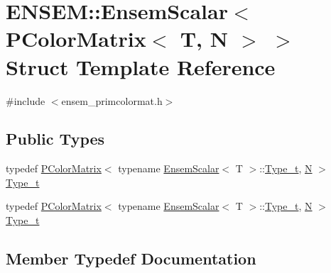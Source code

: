 \hypertarget{structENSEM_1_1EnsemScalar_3_01PColorMatrix_3_01T_00_01N_01_4_01_4}{}\section{E\+N\+S\+EM\+:\+:Ensem\+Scalar$<$ P\+Color\+Matrix$<$ T, N $>$ $>$ Struct Template Reference}
\label{structENSEM_1_1EnsemScalar_3_01PColorMatrix_3_01T_00_01N_01_4_01_4}


{\ttfamily \#include $<$ensem\+\_\+primcolormat.\+h$>$}

\subsection*{Public Types}
\begin{DoxyCompactItemize}
\item 
typedef \mbox{\hyperlink{classENSEM_1_1PColorMatrix}{P\+Color\+Matrix}}$<$ typename \mbox{\hyperlink{structENSEM_1_1EnsemScalar}{Ensem\+Scalar}}$<$ T $>$\+::\mbox{\hyperlink{structENSEM_1_1EnsemScalar_3_01PColorMatrix_3_01T_00_01N_01_4_01_4_a627b90bc6a46b2ef5b68cc55ae3f914d}{Type\+\_\+t}}, \mbox{\hyperlink{operator__name__util_8cc_a7722c8ecbb62d99aee7ce68b1752f337}{N}} $>$ \mbox{\hyperlink{structENSEM_1_1EnsemScalar_3_01PColorMatrix_3_01T_00_01N_01_4_01_4_a627b90bc6a46b2ef5b68cc55ae3f914d}{Type\+\_\+t}}
\item 
typedef \mbox{\hyperlink{classENSEM_1_1PColorMatrix}{P\+Color\+Matrix}}$<$ typename \mbox{\hyperlink{structENSEM_1_1EnsemScalar}{Ensem\+Scalar}}$<$ T $>$\+::\mbox{\hyperlink{structENSEM_1_1EnsemScalar_3_01PColorMatrix_3_01T_00_01N_01_4_01_4_a627b90bc6a46b2ef5b68cc55ae3f914d}{Type\+\_\+t}}, \mbox{\hyperlink{operator__name__util_8cc_a7722c8ecbb62d99aee7ce68b1752f337}{N}} $>$ \mbox{\hyperlink{structENSEM_1_1EnsemScalar_3_01PColorMatrix_3_01T_00_01N_01_4_01_4_a627b90bc6a46b2ef5b68cc55ae3f914d}{Type\+\_\+t}}
\end{DoxyCompactItemize}


\subsection{Member Typedef Documentation}
\mbox{\label{structENSEM_1_1EnsemScalar_3_01PColorMatrix_3_01T_00_01N_01_4_01_4_a627b90bc6a46b2ef5b68cc55ae3f914d}} 
